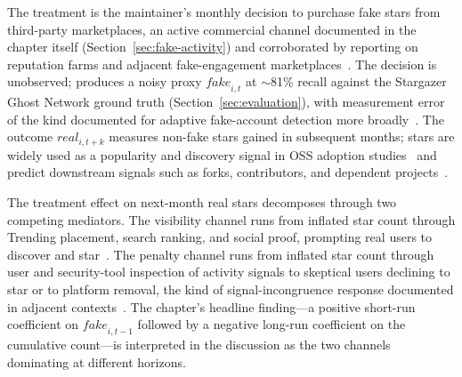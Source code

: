 The treatment is the maintainer's monthly decision to purchase fake stars from third-party marketplaces, an active commercial channel documented in the chapter itself (Section~\ref{sec:fake-activity}) and corroborated by reporting on reputation farms and adjacent fake-engagement marketplaces~\cite{reputation-farm, taobao-github-star, gitstar, DBLP:conf/imc/StringhiniWEKVZZ13, DBLP:conf/ccs/CaoYYP14}.
The decision is unobserved; \SystemName produces a noisy proxy $\textit{fake}_{i,t}$ at $\sim$81\% recall against the Stargazer Ghost Network ground truth (Section~\ref{sec:evaluation}), with measurement error of the kind documented for adaptive fake-account detection more broadly~\cite{DBLP:conf/uss/ThomasMGKP13, DBLP:conf/uss/ViswanathBCGGKM14, DBLP:conf/www/CresciPPST17}.
The outcome $\textit{real}_{i, t+k}$ measures non-fake stars gained in subsequent months; stars are widely used as a popularity and discovery signal in OSS adoption studies~\cite{DBLP:conf/cscw/DabbishSTH12, DBLP:journals/software/BegelBS13a, DBLP:journals/jss/BorgesV18, DBLP:conf/msr/FangKLHV20} and predict downstream signals such as forks, contributors, and dependent projects~\cite{DBLP:conf/icse/TsayDH14}.

The treatment effect on next-month real stars decomposes through two competing mediators.
The visibility channel runs from inflated star count through Trending placement, search ranking, and social proof, prompting real users to discover and star~\cite{trending-works, github-trending, DBLP:conf/icse/TsayDH14, DBLP:journals/jmis/MoqriMQB18, dellarocas2010online, DBLP:conf/icse/TrockmanZKV18}.
The penalty channel runs from inflated star count through user and security-tool inspection of activity signals to skeptical users declining to star or to platform removal, the kind of signal-incongruence response documented in adjacent contexts~\cite{startup-stars, github-star-trust, DBLP:journals/dss/CresciPPST15, mukherjee2013yelp, DBLP:journals/tkdd/YangWWGZD14, schueller2024modeling, github-policy}.
The chapter's headline finding---a positive short-run coefficient on $\textit{fake}_{i, t-1}$ followed by a negative long-run coefficient on the cumulative count---is interpreted in the discussion as the two channels dominating at different horizons.

